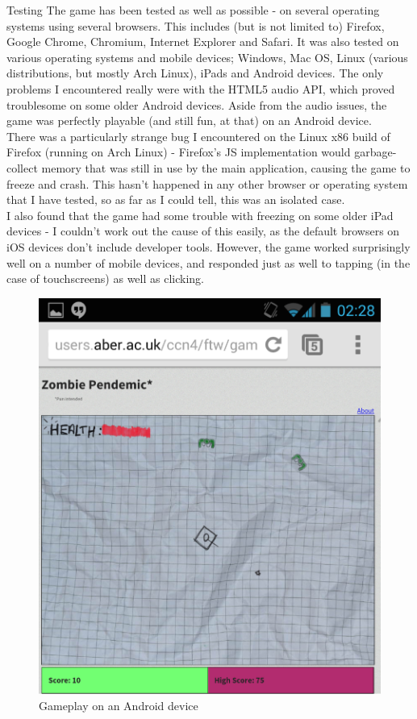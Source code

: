 \documentclass[11pt]{article}
\begin{document}
    \begin{section}{Testing}
    		The game has been tested as well as possible - on several operating systems using several browsers. This includes (but is not limited to) Firefox, Google Chrome, Chromium, Internet Explorer and Safari. It was also tested on various operating systems and mobile devices; Windows, Mac OS, Linux (various distributions, but mostly Arch Linux), iPads and Android devices. The only problems I encountered really were with the HTML5 audio API, which proved troublesome on some older Android devices. Aside from the audio issues, the game was perfectly playable (and still fun, at that) on an Android device. \\
    		
    		There was a particularly strange bug I encountered on the Linux x86 build of Firefox (running on Arch Linux) - Firefox's JS implementation would garbage-collect memory that was still in use by the main application, causing the game to freeze and crash. This hasn't happened in any other browser or operating system that I have tested, so as far as I could tell, this was an isolated case.\\
    		
    		I also found that the game had some trouble with freezing on some older iPad devices - I couldn't work out the cause of this easily, as the default browsers on iOS devices don't include developer tools. However, the game worked surprisingly well on a number of mobile devices, and responded just as well to tapping (in the case of touchscreens) as well as clicking.
    		
 		\vspace{0.5in}
		\begin{figure}[htp]
			\centering
			\includegraphics[height=0.5\columnwidth]{img/android}
			\caption{Gameplay on an Android device}
		\end{figure}
		

\end{section}
\end{document}
